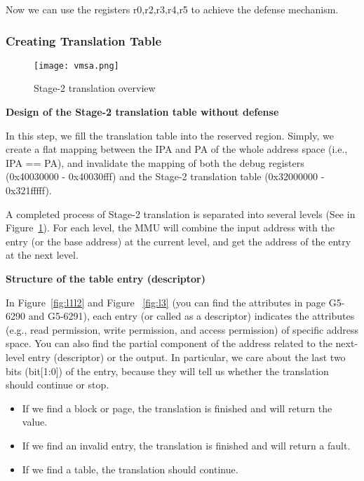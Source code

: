 Now we can use the registers r0,r2,r3,r4,r5 to achieve the defense mechanism.

\subsubsection{Creating Translation Table}

\begin{figure}[htb]
	\centering
	\texttt{[image: vmsa.png]}
	\caption{Stage-2 translation overview}
	\label{fig:vmsa}
\end{figure}

\vspace{10pt}
\textbf{Design of the Stage-2 translation table without defense}
\vspace{10pt}

In this step, we fill the translation table into the reserved region. 
Simply, we create a flat mapping between the IPA and PA of the whole address space (i.e., IPA == PA), and invalidate the mapping of both the debug registers (0x40030000 - 0x40030fff) and the Stage-2 translation table (0x32000000 - 0x321fffff).

A completed process of Stage-2 translation is separated into several levels (See in Figure~\ref{fig:vmsa}). For each level, the MMU will combine the input address with the entry (or the base address) at the current level, and get the address of the entry at the next level. 

\vspace{10pt}
\textbf{Structure of the table entry (descriptor)}
\vspace{10pt}

In Figure~\ref{fig:l1l2} and Figure ~\ref{fig:l3} (you can find the attributes in page G5-6290 and G5-6291),
each entry (or called as a descriptor) indicates the attributes (e.g., read permission, write permission, and access permission) of specific address space.
You can also find the partial component of the address related to the next-level entry (descriptor) or the output.
In particular, we care about the last two bits (bit[1:0]) of the entry, because they will tell us whether the translation should continue or stop. 

\begin{itemize}
	\item If we find a block or page, the translation is finished and will return the value.
	\item If we find an invalid entry, the translation is finished and will return a fault.
	\item If we find a table, the translation should continue.
\end{itemize}

